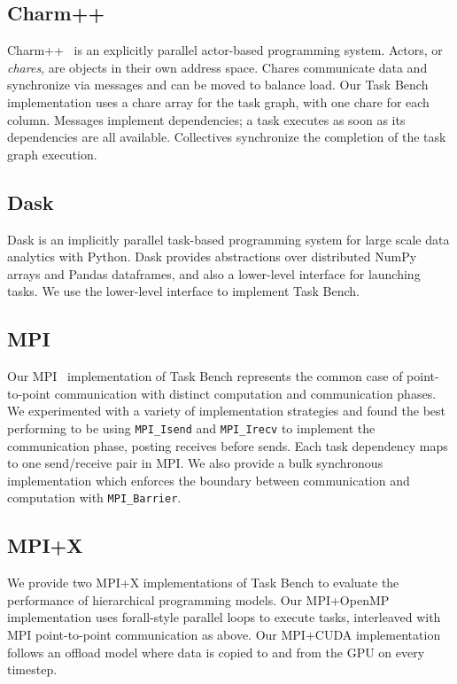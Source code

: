 \subsection{Charm++}

Charm++~\cite{Charmpp93} is an explicitly parallel actor-based programming system. Actors, or
\emph{chares}, are objects in their own address space.
Chares communicate data and synchronize via messages and can be moved
to balance load. Our Task Bench implementation uses a chare
array for the task graph, with one chare for each column. Messages implement dependencies; a task executes as soon as its
dependencies are all available. Collectives synchronize the
completion of the task graph execution.


\subsection{Dask}

Dask is an implicitly parallel task-based programming system for large
scale data analytics with Python. Dask provides abstractions over
distributed NumPy arrays and Pandas dataframes, and also a lower-level
interface for launching tasks. We use the lower-level interface to
implement Task Bench.

\subsection{MPI}

Our MPI~\cite{MPI} implementation of Task Bench represents the common
case of point-to-point communication with distinct computation and
communication phases. We experimented with a variety of implementation
strategies and found the best performing to be using
\lstinline[language=C++]{MPI_Isend} and
\lstinline[language=C++]{MPI_Irecv} to implement the communication
phase, posting receives before sends. Each task dependency maps to one
send/receive pair in MPI. We also provide a bulk synchronous
implementation which enforces the boundary between communication and
computation with \lstinline[language=C++]{MPI_Barrier}.

\subsection{MPI+X}

We provide two MPI+X implementations of Task Bench to evaluate the
performance of hierarchical programming models. Our MPI+OpenMP
implementation uses forall-style parallel loops to execute tasks,
interleaved with MPI point-to-point communication as above. Our
MPI+CUDA implementation follows an offload model where data is copied
to and from the GPU on every timestep.

